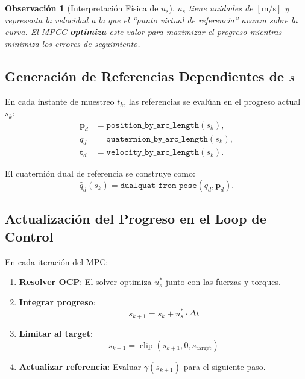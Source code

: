 \documentclass[11pt,a4paper]{article}
\newtheorem{remark}[theorem]{Observación}
\begin{document}
\begin{remark}[Interpretación Física de $u_s$]
$u_s$ tiene unidades de $[\text{m/s}]$ y representa la velocidad a la que el ``punto virtual de referencia'' avanza sobre la curva. El MPCC \textbf{optimiza} este valor para maximizar el progreso mientras minimiza los errores de seguimiento.
\end{remark}

\subsection{Generación de Referencias Dependientes de $s$}

En cada instante de muestreo $t_k$, las referencias se evalúan en el progreso actual $s_k$:
\begin{align}
    \mathbf{p}_d &= \texttt{position\_by\_arc\_length}(s_k), \\
    q_d &= \texttt{quaternion\_by\_arc\_length}(s_k), \\
    \mathbf{t}_d &= \texttt{velocity\_by\_arc\_length}(s_k).
\end{align}

El cuaternión dual de referencia se construye como:
\begin{equation}
    \hat{q}_d(s_k) = \texttt{dualquat\_from\_pose}(q_d, \mathbf{p}_d).
\end{equation}

\subsection{Actualización del Progreso en el Loop de Control}

En cada iteración del MPC:

\begin{enumerate}
    \item \textbf{Resolver OCP}: El solver optimiza $u_s^*$ junto con las fuerzas y torques.
    
    \item \textbf{Integrar progreso}: 
    \begin{equation}
        s_{k+1} = s_k + u_s^* \cdot \Delta t
    \end{equation}
    
    \item \textbf{Limitar al target}:
    \begin{equation}
        s_{k+1} = \operatorname{clip}(s_{k+1}, 0, s_{\text{target}})
    \end{equation}
    
    \item \textbf{Actualizar referencia}: Evaluar $\gamma(s_{k+1})$ para el siguiente paso.
\end{enumerate}
\end{document}
